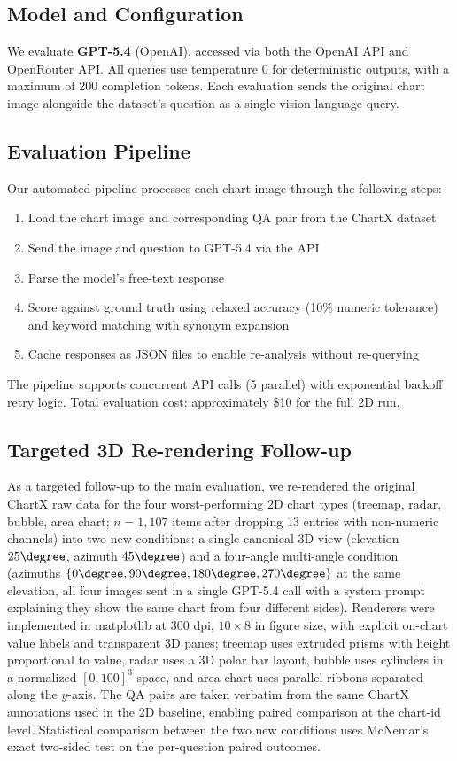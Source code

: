 \documentclass[sigconf, 10pt]{acmart}
\begin{document}
\subsection{Model and Configuration}
We evaluate \textbf{GPT-5.4} (OpenAI), accessed via both the OpenAI API and OpenRouter API. All queries use temperature 0 for deterministic outputs, with a maximum of 200 completion tokens. Each evaluation sends the original chart image alongside the dataset's question as a single vision-language query.

\subsection{Evaluation Pipeline}
Our automated pipeline processes each chart image through the following steps:
\begin{enumerate}
    \item Load the chart image and corresponding QA pair from the ChartX dataset
    \item Send the image and question to GPT-5.4 via the API
    \item Parse the model's free-text response
    \item Score against ground truth using relaxed accuracy (10\% numeric tolerance) and keyword matching with synonym expansion
    \item Cache responses as JSON files to enable re-analysis without re-querying
\end{enumerate}

The pipeline supports concurrent API calls (5 parallel) with exponential backoff retry logic. Total evaluation cost: approximately \$10 for the full 2D run.

\subsection{Targeted 3D Re-rendering Follow-up}
As a targeted follow-up to the main evaluation, we re-rendered the original ChartX raw data for the four worst-performing 2D chart types (treemap, radar, bubble, area chart; $n{=}1{,}107$ items after dropping 13 entries with non-numeric channels) into two new conditions: a single canonical 3D view (elevation $25\degree$, azimuth $45\degree$) and a four-angle multi-angle condition (azimuths $\{0\degree, 90\degree, 180\degree, 270\degree\}$ at the same elevation, all four images sent in a single GPT-5.4 call with a system prompt explaining they show the same chart from four different sides). Renderers were implemented in matplotlib at 300 dpi, $10\times8$ in figure size, with explicit on-chart value labels and transparent 3D panes; treemap uses extruded prisms with height proportional to value, radar uses a 3D polar bar layout, bubble uses cylinders in a normalized $[0,100]^3$ space, and area chart uses parallel ribbons separated along the $y$-axis. The QA pairs are taken verbatim from the same ChartX annotations used in the 2D baseline, enabling paired comparison at the chart-id level. Statistical comparison between the two new conditions uses McNemar's exact two-sided test on the per-question paired outcomes.
\end{document}
